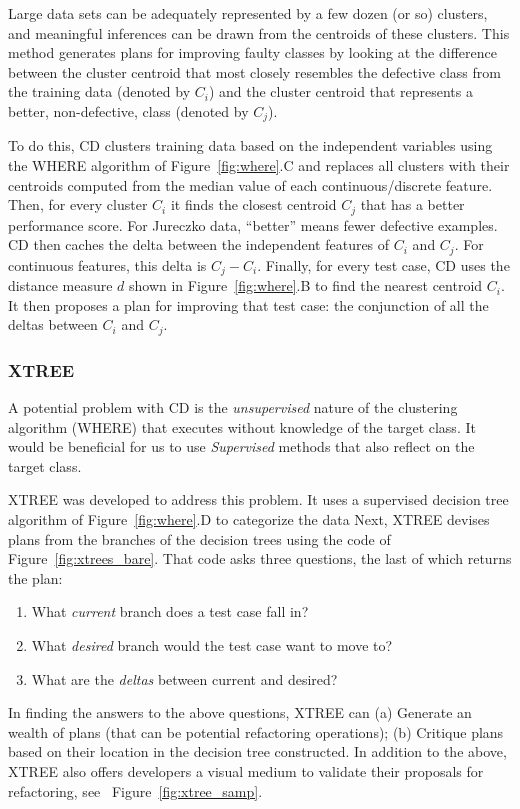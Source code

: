 \documentclass{sig-alternate}
\newcommand{\be}{\begin{enumerate}}
\newcommand{\ee}{\end{enumerate}}
\newcommand{\fig}[1]{Figure~\ref{fig:#1}}
\begin{document}
{\begin{itemize}[leftmargin=3mm]
Large data sets can be adequately represented by a few dozen (or so) clusters, and meaningful inferences can be drawn from the centroids of these clusters. This method generates plans for improving faulty classes by looking at the difference between the cluster centroid that most closely resembles the defective class from the training data (denoted by $C_i$) and the cluster centroid that represents a better, non-defective, class (denoted by $C_j$).
 
To do this, CD clusters training data based on the independent variables using the WHERE algorithm of \fig{where}.C and replaces all clusters with their centroids computed from the median value of each continuous/discrete feature. Then, for every cluster $C_i$ it finds the closest centroid $C_j$ that has a better performance score. For Jureczko data, ``better'' means fewer defective examples. CD then caches the delta between the independent features of $C_i$ and $C_j$. For continuous features, this delta is $C_j - C_i$. Finally, for every test case, CD uses the distance measure $d$ shown in \fig{where}.B to find the nearest centroid $C_i$.  It then proposes a plan for improving that test case: the conjunction of all the deltas between $C_i$ and $C_j$.




\subsubsection{XTREE}

A potential problem with CD is the {\em unsupervised} nature of the clustering algorithm (WHERE) that executes without knowledge of the target class. It would be beneficial for us to use {\em Supervised} methods that also reflect on the target class.

XTREE was developed to address this problem. It uses a supervised decision tree algorithm of \fig{where}.D to categorize the data Next, XTREE devises plans from the branches of the decision trees using the code of \fig{xtrees_bare}. That code asks three questions, the last of which returns the plan:

\be
\item What {\em current} branch does a test case fall in?
\item What {\em desired} branch would the test case want to move to?
\item What are the {\em deltas} between current and desired? 
\ee

In finding the answers to the above questions, XTREE can (a) Generate an wealth of plans (that can be potential refactoring operations); (b) Critique plans based on their location in the decision tree constructed. In addition to the above, XTREE also offers developers a visual medium to validate their proposals for refactoring, see ~\fig{xtree_samp}.


\end{itemize}}
\end{document}
